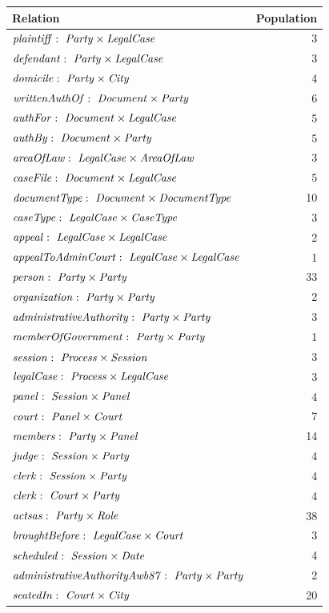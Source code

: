 \documentclass[10pt,a4paper]{report}              %
\theoremstyle{plain}\theorembodyfont{\rmfamily}\newtheorem{definition}{Definition}[section]
\theoremstyle{plain}\theorembodyfont{\rmfamily}\newtheorem{designrule}[definition]{Requirement}
\def\id#1{\mbox{\em #1\/}}
\newcommand{\rel}{\times}
\newcommand{\declare}[3]{\id{#1}:\ \id{#2}\rel\id{#3}}
\begin{document}
\begin{center}
\begin{tabular}{lr}
Relation & Population\\
\hline
$\declare{plaintiff}{Party}{LegalCase}$ & 3\\
$\declare{defendant}{Party}{LegalCase}$ & 3\\
$\declare{domicile}{Party}{City}$ & 4\\
$\declare{writtenAuthOf}{Document}{Party}$ & 6\\
$\declare{authFor}{Document}{LegalCase}$ & 5\\
$\declare{authBy}{Document}{Party}$ & 5\\
$\declare{areaOfLaw}{LegalCase}{AreaOfLaw}$ & 3\\
$\declare{caseFile}{Document}{LegalCase}$ & 5\\
$\declare{documentType}{Document}{DocumentType}$ & 10\\
$\declare{caseType}{LegalCase}{CaseType}$ & 3\\
$\declare{appeal}{LegalCase}{LegalCase}$ & 2\\
$\declare{appealToAdminCourt}{LegalCase}{LegalCase}$ & 1\\
$\declare{person}{Party}{Party}$ & 33\\
$\declare{organization}{Party}{Party}$ & 2\\
$\declare{administrativeAuthority}{Party}{Party}$ & 3\\
$\declare{memberOfGovernment}{Party}{Party}$ & 1\\
$\declare{session}{Process}{Session}$ & 3\\
$\declare{legalCase}{Process}{LegalCase}$ & 3\\
$\declare{panel}{Session}{Panel}$ & 4\\
$\declare{court}{Panel}{Court}$ & 7\\
$\declare{members}{Party}{Panel}$ & 14\\
$\declare{judge}{Session}{Party}$ & 4\\
$\declare{clerk}{Session}{Party}$ & 4\\
$\declare{clerk}{Court}{Party}$ & 4\\
$\declare{actsas}{Party}{Role}$ & 38\\
$\declare{broughtBefore}{LegalCase}{Court}$ & 3\\
$\declare{scheduled}{Session}{Date}$ & 4\\
$\declare{administrativeAuthorityAwb87}{Party}{Party}$ & 2\\
$\declare{seatedIn}{Court}{City}$ & 20\\

\end{tabular}
\end{center}
\end{document}
